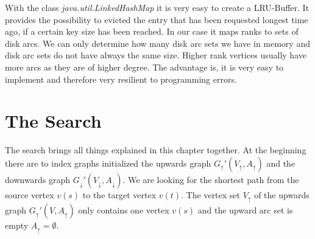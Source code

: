 With the class \textit{java.util.LinkedHashMap} it is very easy to create a LRU-Buffer.
It provides the possibility to evicted the entry that has been requested longest time ago, if a certain key size has been reached.
In our case it maps ranks to sets of disk arcs.
We can only determine how many disk arc sets we have in memory and disk arc sets do not have always the same size.
Higher rank vertices usually have more arcs as they are of higher degree.
The advantage is, it is very easy to implement and therefore very resilient to programming errors.

\section{The Search}

The search brings all things explained in this chapter together.
At the beginning there are to index graphs initialized the upwards graph $G_\uparrow'(V_\uparrow, A_\uparrow)$ and the downwards graph $G_\downarrow'(V_\downarrow, A_\downarrow)$.
We are looking for the shortest path from the source vertex $v(s)$ to the target vertex $v(t)$.
The vertex set $V_\uparrow$ of the upwards graph $G_\uparrow'(V, A_\uparrow)$ only contains one vertex $v(s)$ and the upward arc set is empty $A_\uparrow = \emptyset$.

